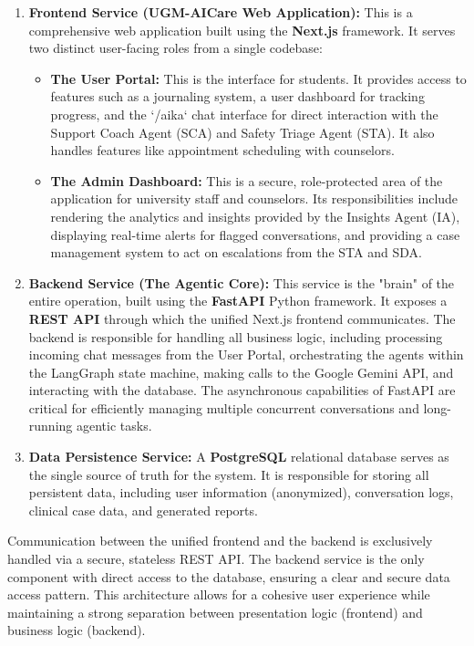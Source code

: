 \begin{enumerate}
    \item \textbf{Frontend Service (UGM-AICare Web Application):} This is a comprehensive web application built using the \textbf{Next.js} framework. It serves two distinct user-facing roles from a single codebase:
        \begin{itemize}
            \item \textbf{The User Portal:} This is the interface for students. It provides access to features such as a journaling system, a user dashboard for tracking progress, and the `/aika` chat interface for direct interaction with the Support Coach Agent (SCA) and Safety Triage Agent (STA). It also handles features like appointment scheduling with counselors.
            \item \textbf{The Admin Dashboard:} This is a secure, role-protected area of the application for university staff and counselors. Its responsibilities include rendering the analytics and insights provided by the Insights Agent (IA), displaying real-time alerts for flagged conversations, and providing a case management system to act on escalations from the STA and SDA.
        \end{itemize}
    \item \textbf{Backend Service (The Agentic Core):} This service is the "brain" of the entire operation, built using the \textbf{FastAPI} Python framework. It exposes a \textbf{REST API} through which the unified Next.js frontend communicates. The backend is responsible for handling all business logic, including processing incoming chat messages from the User Portal, orchestrating the agents within the LangGraph state machine, making calls to the Google Gemini API, and interacting with the database. The asynchronous capabilities of FastAPI are critical for efficiently managing multiple concurrent conversations and long-running agentic tasks.
    \item \textbf{Data Persistence Service:} A \textbf{PostgreSQL} relational database serves as the single source of truth for the system. It is responsible for storing all persistent data, including user information (anonymized), conversation logs, clinical case data, and generated reports.
\end{enumerate}

Communication between the unified frontend and the backend is exclusively handled via a secure, stateless REST API. The backend service is the only component with direct access to the database, ensuring a clear and secure data access pattern. This architecture allows for a cohesive user experience while maintaining a strong separation between presentation logic (frontend) and business logic (backend).


